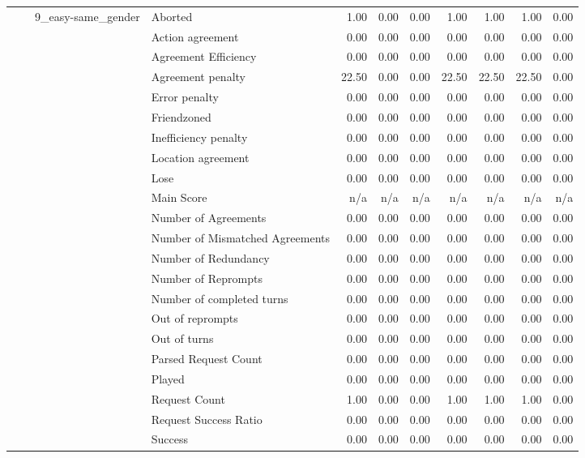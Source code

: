 \begin{tabular}{llllrrrrrrr}
 &  & \multirow[t]{27}{*}{9_easy-same_gender} & Aborted & 1.00 & 0.00 & 0.00 & 1.00 & 1.00 & 1.00 & 0.00 \\
 &  &  & Action agreement & 0.00 & 0.00 & 0.00 & 0.00 & 0.00 & 0.00 & 0.00 \\
 &  &  & Agreement Efficiency & 0.00 & 0.00 & 0.00 & 0.00 & 0.00 & 0.00 & 0.00 \\
 &  &  & Agreement penalty & 22.50 & 0.00 & 0.00 & 22.50 & 22.50 & 22.50 & 0.00 \\
 &  &  & Error penalty & 0.00 & 0.00 & 0.00 & 0.00 & 0.00 & 0.00 & 0.00 \\
 &  &  & Friendzoned & 0.00 & 0.00 & 0.00 & 0.00 & 0.00 & 0.00 & 0.00 \\
 &  &  & Inefficiency penalty & 0.00 & 0.00 & 0.00 & 0.00 & 0.00 & 0.00 & 0.00 \\
 &  &  & Location agreement & 0.00 & 0.00 & 0.00 & 0.00 & 0.00 & 0.00 & 0.00 \\
 &  &  & Lose & 0.00 & 0.00 & 0.00 & 0.00 & 0.00 & 0.00 & 0.00 \\
 &  &  & Main Score & n/a & n/a & n/a & n/a & n/a & n/a & n/a \\
 &  &  & Number of Agreements & 0.00 & 0.00 & 0.00 & 0.00 & 0.00 & 0.00 & 0.00 \\
 &  &  & Number of Mismatched Agreements & 0.00 & 0.00 & 0.00 & 0.00 & 0.00 & 0.00 & 0.00 \\
 &  &  & Number of Redundancy & 0.00 & 0.00 & 0.00 & 0.00 & 0.00 & 0.00 & 0.00 \\
 &  &  & Number of Reprompts & 0.00 & 0.00 & 0.00 & 0.00 & 0.00 & 0.00 & 0.00 \\
 &  &  & Number of completed turns & 0.00 & 0.00 & 0.00 & 0.00 & 0.00 & 0.00 & 0.00 \\
 &  &  & Out of reprompts & 0.00 & 0.00 & 0.00 & 0.00 & 0.00 & 0.00 & 0.00 \\
 &  &  & Out of turns & 0.00 & 0.00 & 0.00 & 0.00 & 0.00 & 0.00 & 0.00 \\
 &  &  & Parsed Request Count & 0.00 & 0.00 & 0.00 & 0.00 & 0.00 & 0.00 & 0.00 \\
 &  &  & Played & 0.00 & 0.00 & 0.00 & 0.00 & 0.00 & 0.00 & 0.00 \\
 &  &  & Request Count & 1.00 & 0.00 & 0.00 & 1.00 & 1.00 & 1.00 & 0.00 \\
 &  &  & Request Success Ratio & 0.00 & 0.00 & 0.00 & 0.00 & 0.00 & 0.00 & 0.00 \\
 &  &  & Success & 0.00 & 0.00 & 0.00 & 0.00 & 0.00 & 0.00 & 0.00 \\

\end{tabular}
